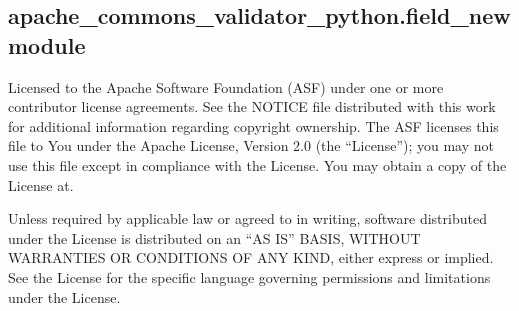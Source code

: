 \documentclass[letterpaper,10pt,english]{sphinxmanual}
\begin{document}
\begin{fulllineitems}
\begin{fulllineitems}
\begin{quote}
\begin{description}
\end{description}\end{quote}

\end{fulllineitems}


\begin{fulllineitems}
\label{\detokenize{apache_commons_validator_python:id6}}
\pysigstartsignatures
{}
\pysigstopsignatures
\end{fulllineitems}


\end{fulllineitems}



\subsection{apache\_commons\_validator\_python.field\_new module}
\label{\detokenize{apache_commons_validator_python:module-apache_commons_validator_python.field_new}}\label{\detokenize{apache_commons_validator_python:apache-commons-validator-python-field-new-module}}
\sphinxAtStartPar
Licensed to the Apache Software Foundation (ASF) under one or more contributor
license agreements.  See the NOTICE file distributed with this work for additional
information regarding copyright ownership. The ASF licenses this file to You under the
Apache License, Version 2.0 (the “License”); you may not use this file except in
compliance with the License.  You may obtain a copy of the License at.

\sphinxAtStartPar
{}

\sphinxAtStartPar
Unless required by applicable law or agreed to in writing, software
distributed under the License is distributed on an “AS IS” BASIS,
WITHOUT WARRANTIES OR CONDITIONS OF ANY KIND, either express or implied.
See the License for the specific language governing permissions and
limitations under the License.
\end{document}
